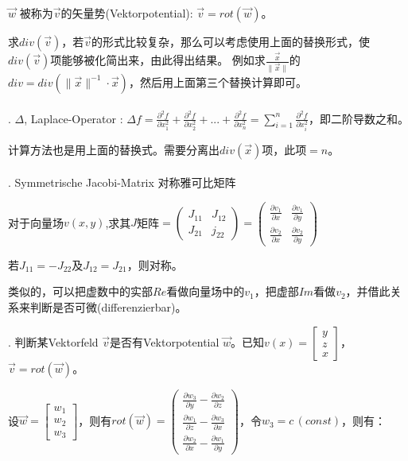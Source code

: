 \documentclass[fleqn]{article}
\begin{document}
$\vec{w}$ 被称为$\vec{v}$的矢量势(Vektorpotential): $\vec{v}=rot(\vec{w})$。

求$div(\vec{v})$，若$\vec{v}$的形式比较复杂，那么可以考虑使用上面的替换形式，使$div(\vec{v})$项能够被化简出来，由此得出结果。
例如求$\frac{\vec{x}}{\|\vec{x}\|}$的$div=div(\|\vec{x}\|^{-1}\cdot\vec{x})$，然后用上面第三个替换计算即可。
\\
\\
. $\Delta$, Laplace-Operator : $\Delta f=\frac{\partial^2 f}{\partial x_1^2}+\frac{\partial^2 f}{\partial x_2^2}+...+\frac{\partial^2 f}{\partial x_n^2}=\sum_{i=1}^{n}\frac{\partial^2 f}{\partial x_i^2} $，即二阶导数之和。

计算方法也是用上面的替换式。需要分离出$div(\vec{x})$项，此项$=n$。
\\
\\
. Symmetrische Jacobi-Matrix 对称雅可比矩阵

对于向量场$v(x,y)$,求其$J$矩阵$=\begin{pmatrix}
    J_{11} & J_{12}\\
    J_{21} & j_{22}
\end{pmatrix}=\begin{pmatrix}
    \frac{\partial v_1}{\partial x} & \frac{\partial v_1}{\partial y}\\
    \frac{\partial v_2}{\partial x} & \frac{\partial v_2}{\partial y}
\end{pmatrix}$

若$J_{11}=-J_{22}$及$J_{12}=J_{21}$，则对称。

类似的，可以把虚数中的实部$Re$看做向量场中的$v_1$，把虚部$Im$看做$v_2$，并借此关系来判断是否可微(differenzierbar)。

. 判断某Vektorfeld $\vec{v}$是否有Vektorpotential $\vec{w}$。已知$v(x)=\begin{bmatrix}
    y\\z\\x
\end{bmatrix}$，$\vec{v}=rot(\vec{w})$。

设$\vec{w}=\begin{bmatrix}
    w_1\\w_2\\w_3
\end{bmatrix}$，则有$rot(\vec{w})=\begin{pmatrix}
    \frac{\partial w_3}{\partial y} - \frac{\partial w_2}{\partial z}\\
    \frac{\partial w_1}{\partial z} - \frac{\partial w_3}{\partial x}\\
    \frac{\partial w_2}{\partial x} - \frac{\partial w_1}{\partial y}
\end{pmatrix}$，令$w_3=c\, (const)$，则有：
\end{document}
